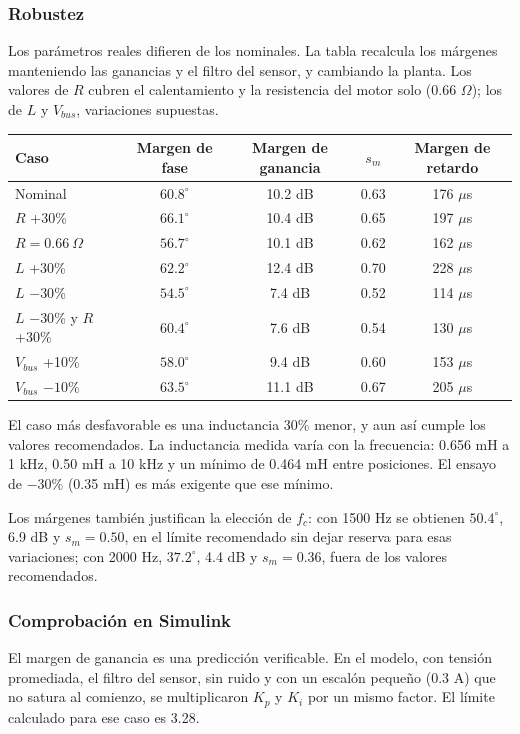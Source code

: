 \subsubsection{Robustez}
Los parámetros reales difieren de los nominales. La tabla recalcula los márgenes manteniendo las ganancias y el filtro del sensor, y cambiando la planta. Los valores de $R$ cubren el calentamiento y la resistencia del motor solo (0.66 $\Omega$); los de $L$ y $V_{bus}$, variaciones supuestas.
\begin{center}
\begin{tabular}{lcccc}\toprule
Caso & Margen de fase & Margen de ganancia & $s_m$ & Margen de retardo\\\midrule
Nominal & $60.8^\circ$ & 10.2 dB & 0.63 & 176 $\mu$s\\
$R$ +30\% & $66.1^\circ$ & 10.4 dB & 0.65 & 197 $\mu$s\\
$R = 0.66\ \Omega$ & $56.7^\circ$ & 10.1 dB & 0.62 & 162 $\mu$s\\
$L$ +30\% & $62.2^\circ$ & 12.4 dB & 0.70 & 228 $\mu$s\\
$L$ $-30$\% & $54.5^\circ$ & 7.4 dB & 0.52 & 114 $\mu$s\\
$L$ $-30$\% y $R$ +30\% & $60.4^\circ$ & 7.6 dB & 0.54 & 130 $\mu$s\\
$V_{bus}$ +10\% & $58.0^\circ$ & 9.4 dB & 0.60 & 153 $\mu$s\\
$V_{bus}$ $-10$\% & $63.5^\circ$ & 11.1 dB & 0.67 & 205 $\mu$s\\\bottomrule
\end{tabular}
\end{center}
El caso más desfavorable es una inductancia 30\% menor, y aun así cumple los valores recomendados. La inductancia medida varía con la frecuencia: 0.656 mH a 1 kHz, 0.50 mH a 10 kHz y un mínimo de 0.464 mH entre posiciones. El ensayo de $-30\%$ (0.35 mH) es más exigente que ese mínimo.

Los márgenes también justifican la elección de $f_c$: con 1500 Hz se obtienen $50.4^\circ$, 6.9 dB y $s_m = 0.50$, en el límite recomendado sin dejar reserva para esas variaciones; con 2000 Hz, $37.2^\circ$, 4.4 dB y $s_m = 0.36$, fuera de los valores recomendados.

\subsubsection{Comprobación en Simulink}
El margen de ganancia es una predicción verificable. En el modelo, con tensión promediada, el filtro del sensor, sin ruido y con un escalón pequeño (0.3 A) que no satura al comienzo, se multiplicaron $K_p$ y $K_i$ por un mismo factor. El límite calculado para ese caso es 3.28.

